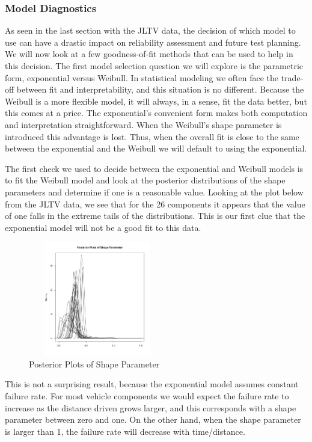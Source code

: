 \documentclass[12pt]{article}
\begin{document}
\subsubsection{Model Diagnostics}
As seen in the last section with the JLTV data, the decision of which model to
use can have a drastic impact on reliability assessment and future test
planning.  We will now look at a few  goodness-of-fit methods that can be used
to help in this decision.  The first model selection question we will explore is
the parametric form, exponential versus Weibull.  In statistical modeling we
often face the trade-off between fit and interpretability, and this situation is
no different. Because the Weibull is a more flexible model, it will always, in a
sense, fit the data better, but this comes at a price.  The exponential's
convenient form makes both computation and interpretation straightforward.  When
the Weibull's shape parameter is introduced this advantage is lost.  Thus, when
the overall fit is close to the same between the exponential and the Weibull we
will default to using the exponential.

The first check we used to decide between the exponential and Weibull models is
to fit the Weibull model and look at the posterior distributions of the
shape parameters and determine if one is a reasonable value.  Looking at the
plot below from the JLTV data, we see that for the 26 components it appears
that the value of one falls in the extreme tails of the distributions.  This is
our first clue that the exponential model will not be a good fit to this data.

\begin{figure}
  \centering
      \includegraphics[width=6cm, height=5cm]{betaPostPlot}
  \caption{Posterior Plots of Shape Parameter}
\end{figure}

This is not a surprising result, because the exponential model assumes constant
failure rate.  For most vehicle components we would expect the failure rate to
increase as the distance driven grows larger, and this corresponds with a shape
parameter between zero and one.  On the other hand, when the shape parameter is
larger than 1, the failure rate will decrease with time/distance.
\end{document}
